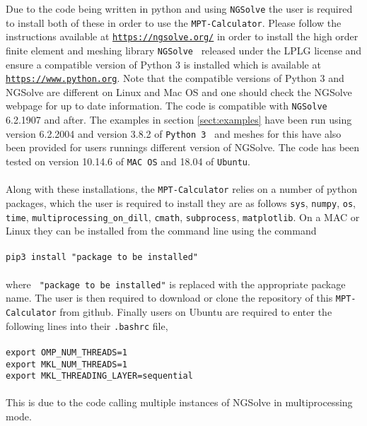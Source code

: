 Due to the code being written in python and using \texttt{NGSolve} the user is required to install both of these in order to use the \texttt{MPT-Calculator}.  Please follow the instructions available at \href{https://ngsolve.org/}{\texttt{https://ngsolve.org/}} in order to install the high order finite element and meshing library  \texttt{NGSolve}~\cite{NGSolve,zaglmayrphd,netgendet}  released under the LPLG license and ensure a compatible version of Python 3 is installed
which is available at \href{https://www.python.org}{\texttt{https://www.python.org}}. Note that the compatible versions of Python 3 and NGSolve are different on Linux and Mac OS and one should check the NGSolve webpage for up to date information. The code is compatible with \texttt{NGSolve} 6.2.1907 and after. The examples in section \ref{sect:examples} have been run using version 6.2.2004 and version 3.8.2 of \texttt{Python 3}~\cite{python} and meshes for this have also been provided for users runnings different version of NGSolve. The code has been tested on version 10.14.6 of \texttt{MAC OS} and 18.04 of \texttt{Ubuntu}.\\
\\
\noindent
Along with these installations, the \texttt{MPT-Calculator} relies on a number of python packages, which the user is required to install they are as follows \texttt{sys}, \texttt{numpy}, \texttt{os}, \texttt{time}, \texttt{multiprocessing\_on\_dill}, \texttt{cmath}, \texttt{subprocess}, \texttt{matplotlib}. On a MAC or Linux they can be installed from the command line using the command\\
\\
\texttt{pip3 install "package to be installed"}\\
\\
where \texttt{ "package to be installed"} is replaced with the appropriate package name. The user is then required to download or clone the repository of this \texttt{MPT-Calculator} from github. Finally users on Ubuntu are required to enter the following lines into their \texttt{.bashrc} file,\\
\\
\texttt{export OMP\_NUM\_THREADS=1}\\
\texttt{export MKL\_NUM\_THREADS=1}\\
\texttt{export MKL\_THREADING\_LAYER=sequential}\\
\\
This is due to the code calling multiple instances of NGSolve in multiprocessing mode.